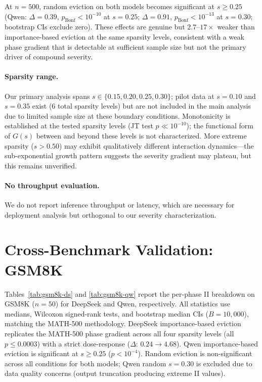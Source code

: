 At $n{=}500$, random eviction on both models becomes significant at $s \geq 0.25$ (Qwen: $\Delta{=}0.39$, $p_{\text{Bonf}} < 10^{-10}$ at $s{=}0.25$; $\Delta{=}0.91$, $p_{\text{Bonf}} < 10^{-13}$ at $s{=}0.30$; bootstrap CIs exclude zero).
These effects are genuine but $2.7$--$17{\times}$ weaker than importance-based eviction at the same sparsity levels, consistent with a weak phase gradient that is detectable at sufficient sample size but not the primary driver of compound severity.

\paragraph{Sparsity range.}
Our primary analysis spans $s \in \{0.15, 0.20, 0.25, 0.30\}$; pilot data at $s{=}0.10$ and $s{=}0.35$ exist (6 total sparsity levels) but are not included in the main analysis due to limited sample size at these boundary conditions. Monotonicity is established at the tested sparsity levels (JT test $p \ll 10^{-10}$); the functional form of $G(s)$ between and beyond these levels is not characterized.
More extreme sparsity ($s > 0.50$) may exhibit qualitatively different interaction dynamics---the sub-exponential growth pattern suggests the severity gradient may plateau, but this remains unverified.


\paragraph{No throughput evaluation.}
We do not report inference throughput or latency, which are necessary for deployment analysis but orthogonal to our severity characterization.



\section{Cross-Benchmark Validation: GSM8K}
\label{app:gsm8k}

Tables~\ref{tab:gsm8k-ds} and \ref{tab:gsm8k-qw} report the per-phase II breakdown on GSM8K ($n{=}50$) for DeepSeek and Qwen, respectively. All statistics use medians, Wilcoxon signed-rank tests, and bootstrap median CIs ($B{=}10{,}000$), matching the MATH-500 methodology. DeepSeek importance-based eviction replicates the MATH-500 phase gradient across all four sparsity levels (all $p \leq 0.0003$) with a strict dose-response ($\Delta$: $0.24 \to 4.68$). Qwen importance-based eviction is significant at $s \geq 0.25$ ($p < 10^{-4}$). Random eviction is non-significant across all conditions for both models; Qwen random $s{=}0.30$ is excluded due to data quality concerns (output truncation producing extreme II values).


